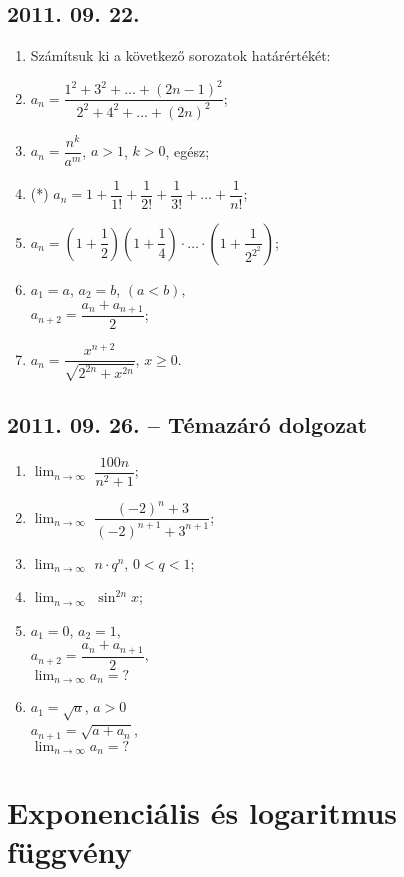\subsection*{2011. 09. 22.}
\begin{enumerate}
\item Számítsuk ki a következő sorozatok határértékét:
	\item $a_n=\dfrac{1^2+3^2+\ldots+(2n-1)^2}{2^2+4^2+\ldots+(2n)^2}$;
    \item $a_n=\dfrac{n^k}{a^m}$, $a>1$, $k>0$, egész;
    \item (*) $a_n=1+\dfrac{1}{1!}+\dfrac{1}{2!}+\dfrac{1}{3!}+\ldots+\dfrac{1}{n!}$;
    \item $a_n=\left(1+\dfrac{1}{2}\right)\left(1+\dfrac{1}{4}\right)\cdot\ldots\cdot\left(1+\dfrac{1}{2^{2^2}}\right)$;
    \item $a_1=a$, $a_2=b$, $(a<b)$,\\ $a_{n+2}=\dfrac{a_n+a_{n+1}}{2}$;
    \item $a_n=\dfrac{x^{n+2}}{\sqrt{2^{2n}+x^{2n}}}$, $x\ge 0$.
\end{enumerate}

\subsection*{2011. 09. 26. -- Témazáró dolgozat}
\begin{enumerate}
	\item $\displaystyle\lim_{n \to \infty}$ $\dfrac{100n}{n^2+1}$;
	\item $\displaystyle\lim_{n \to \infty}$ $\dfrac{(-2)^n+3}{(-2)^{n+1}+3^{n+1}}$;
    \item $\displaystyle\lim_{n \to \infty}$ $n\cdot q^n$, $0<q<1$;
	\item $\displaystyle\lim_{n \to \infty}$ $\sin^{2n}x$;
    \item $a_1=0$, $a_2=1$, \\ $a_{n+2}=\dfrac{a_n+a_{n+1}}{2}$, \\ $\displaystyle\lim_{n \to \infty} a_n=?$
    \item $a_1=\sqrt{a}$, $a>0$\\ $a_{n+1}=\sqrt{a+a_n}$, \\ $\displaystyle\lim_{n \to \infty} a_n=?$





\end{enumerate}

\section{Exponenciális és logaritmus függvény}
	
